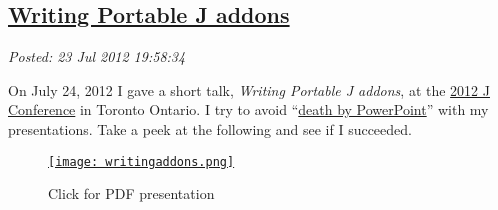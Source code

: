 %

\subsection*{\href{https://bakerjd99.wordpress.com/2012/07/23/writing-portable-j-addons/}{Writing Portable J addons}}


\noindent\emph{Posted: 23 Jul 2012 19:58:34}
\vspace{6pt}

On July 24, 2012 I gave a short talk, \emph{Writing Portable J addons},
at the
\href{http://www.jsoftware.com/jwiki/Community/Conference2012}{2012 J
Conference} in Toronto Ontario. I try to avoid
``\href{http://www.slideshare.net/thecroaker/death-by-powerpoint}{death
by PowerPoint}'' with my presentations. Take a peek at the following and
see if I succeeded.



\captionsetup[figure]{labelformat=empty}
\begin{figure}[htbp]
\centering
\href{https://github.com/bakerjd99/jacks/blob/master/dogpony/WritingPortableJaddons.pdf}{\texttt{[image: writingaddons.png]}}
\caption{Click for PDF presentation}
\label{fig:3059X0}
\end{figure}



%